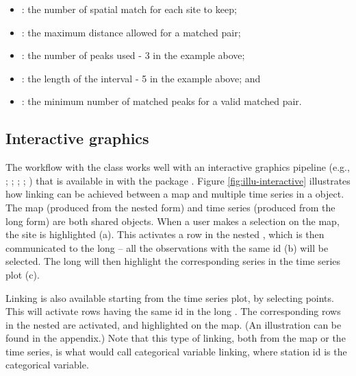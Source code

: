 \documentclass[
  shortnames]{jss}
\providecommand{\tightlist}{%
  \setlength{\itemsep}{0pt}\setlength{\parskip}{0pt}}
\begin{document}
\begin{itemize}
\tightlist
\item
  : the number of spatial match for each site to keep;
\item
  : the maximum distance allowed for a matched pair;
\item
  : the number of peaks used - 3 in the example above;
\item
  : the length of the interval - 5 in the example above; and
\item
  : the minimum number of matched peaks for a valid matched pair.
\end{itemize}

\hypertarget{interactive-graphics}{%
\subsection{Interactive graphics}\label{interactive-graphics}}

The workflow with the  class works well with an interactive graphics pipeline (e.g., \citet{buja1988elements}; \citet{buja1996interactive}; \citet{sutherland2000orca}; \citet{xie2014reactive}; \citet{cheng2016enabling}) that is available in  with the package  \citep{crosstalk}. Figure \ref{fig:illu-interactive} illustrates how linking can be achieved between a map and multiple time series in a  object. The map (produced from the nested form) and time series (produced from the long form) are both shared  objects. When a user makes a selection on the map, the site is highlighted (a). This activates a row in the nested , which is then communicated to the long  -- all the observations with the same id (b) will be selected. The long  will then highlight the corresponding series in the time series plot (c).

Linking is also available starting from the time series plot, by selecting points. This will activate rows having the same id in the long . The corresponding rows in the nested  are activated, and highlighted on the map. (An illustration can be found in the appendix.) Note that this type of linking, both from the map or the time series, is what \citet{CS07} would call categorical variable linking, where station id is the categorical variable.
\end{document}
